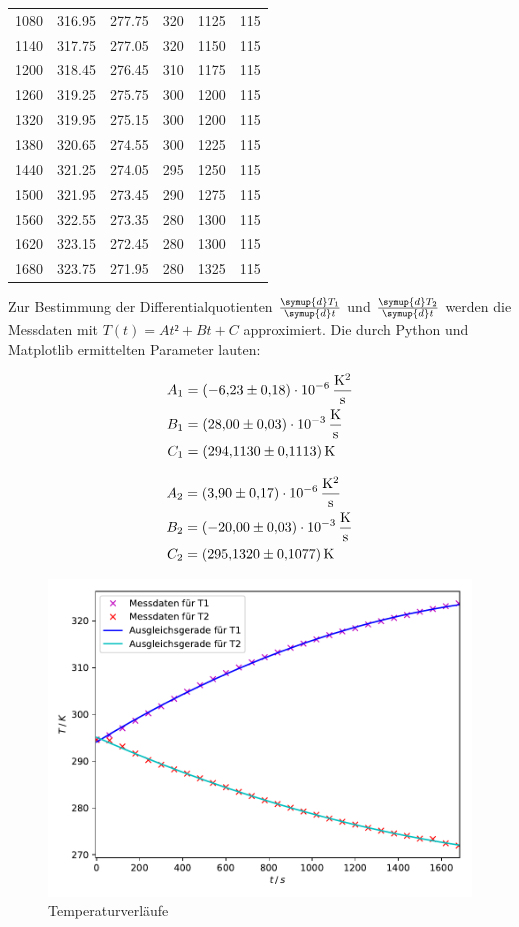 \begin{table}
\begin{tabular}{c c c c c c}
1080 & 316.95 & 277.75 & 320 & 1125 & 115\\
1140 & 317.75 & 277.05 & 320 & 1150 & 115\\
1200 & 318.45 & 276.45 & 310 & 1175 & 115\\
1260 & 319.25 & 275.75 & 300 & 1200 & 115\\
1320 & 319.95 & 275.15 & 300 & 1200 & 115\\
1380 & 320.65 & 274.55 & 300 & 1225 & 115\\
1440 & 321.25 & 274.05 & 295 & 1250 & 115\\
1500 & 321.95 & 273.45 & 290 & 1275 & 115\\
1560 & 322.55 & 273.35 & 280 & 1300 & 115\\
1620 & 323.15 & 272.45 & 280 & 1300 & 115\\
1680 & 323.75 & 271.95 & 280 & 1325 & 115\\
\bottomrule
\end{tabular}
\end{table}

Zur Bestimmung der Differentialquotienten $\frac{\symup{d}T_1}{\symup{d}t}$ und 
$\frac{\symup{d}T_2}{\symup{d}t}$ werden die Messdaten mit $T(t)=At²+Bt+C$ 
approximiert. Die durch Python und Matplotlib ermittelten Parameter lauten: 

\begin{align*}
A_1 &= \SI{-6.23+-0.18e-6}{\kelvin\per\squared\second}\\
B_1 &= \SI{28+-0.03e-3}{\kelvin\per\second}\\
C_1 &= \SI{294.113+-0.1113}{\kelvin}
\end{align*}

\begin{align*}
A_2 &= \SI{3.90+-0.17e-6}{\kelvin\per\squared\second}\\
B_2 &= \SI{-20+-0.03e-3}{\kelvin\per\second}\\
C_2 &= \SI{295.132+-0.1077}{\kelvin}
\end{align*}

\begin{figure}
  \centering
  \includegraphics[scale=0.8]{content/plot1.pdf}
  \caption{Temperaturverläufe}
  \label{fig:plot}
\end{figure}

